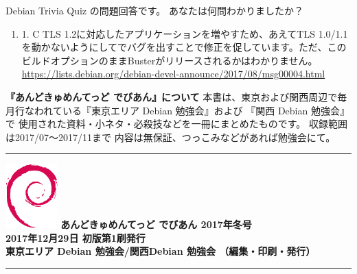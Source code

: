 \documentclass[mingoth,a4paper]{jsarticle}
\begin{document}

 Debian Trivia Quiz の問題回答です。
 あなたは何問わかりましたか？ \\
\begin{enumerate}
\item 1. C TLS 1.2に対応したアプリケーションを増やすため、あえてTLS 1.0/1.1を動かないようにしてでバグを出すことで修正を促しています。ただ、このビルドオプションのままBusterがリリースされるかはわかりません。\url {https://lists.debian.org/debian-devel-announce/2017/08/msg00004.html}\\
\end{enumerate}


\newpage
\thispagestyle{empty}\mbox{}
\newpage

\thispagestyle{empty}
{
\large
\begin{itembox}{\bf 『あんどきゅめんてっど でびあん』について}
本書は、東京および関西周辺で毎月行なわれている『東京エリア Debian 勉強会』および
『関西 Debian 勉強会』で
使用された資料・小ネタ・必殺技などを一冊にまとめたものです。
収録範囲は2017/07〜2017/11まで
内容は無保証、つっこみなどがあれば勉強会にて。
\end{itembox}
}

\vspace*{16cm}
{\color{dancerlightblue}\rule{\hsize}{1mm}}
\vspace{2mm}
\includegraphics[width=2cm]{image200502/openlogo-nd.eps}
\noindent \Large \bf あんどきゅめんてっど でびあん 2017年冬号\\
\noindent \normalfont 2017年12月29日 \hspace{5mm}  初版第1刷発行\\
\noindent \normalfont 東京エリア Debian 勉強会/関西Debian 勉強会 （編集・印刷・発行）\\
{\color{dancerdarkblue}\rule{\hsize}{1mm}}
\end{document}
